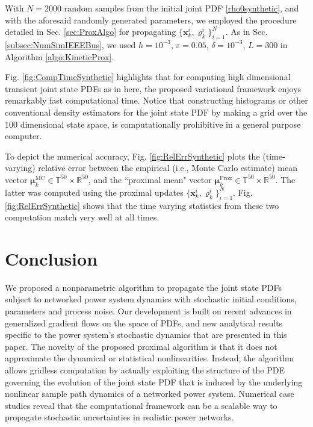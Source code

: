 \documentclass[10pt,twocolumn]{IEEEtran}
\begin{document}
With $N=2000$ random samples from the initial joint PDF \eqref{rho0synthetic}, and with the aforesaid randomly generated parameters, we employed the procedure detailed in Sec. \ref{sec:ProxAlgo} for propagating $\{\bm{x}_{k}^{i},\varrho_{k}^{i}\}_{i=1}^{N}$. As in Sec. \ref{subsec:NumSimIEEEBus}, we used $h=10^{-3}$, $\varepsilon = 0.05$, $\delta = 10^{-3}$, $L = 300$ in Algorithm \ref{algo:KineticProx}.

Fig. \ref{fig:CompTimeSynthetic} highlights that for computing high dimensional transient joint state PDFs as in here, the proposed variational framework enjoys remarkably fast computational time. Notice that constructing histograms or other conventional density estimators for the joint state PDF by making a grid over the 100 dimensional state space, is computationally prohibitive in a general purpose computer. 

To depict the numerical accuracy, Fig. \ref{fig:RelErrSynthetic} plots the (time-varying) relative error between the empirical (i.e., Monte Carlo estimate) mean vector $\bm{\mu}_{k}^{\text{MC}}\in\mathbb{T}^{50}\times\mathbb{R}^{50}$, and the ``proximal mean" vector $\bm{\mu}_{k}^{\text{Prox}}\in\mathbb{T}^{50}\times\mathbb{R}^{50}$. The latter was computed using the proximal updates $\{\bm{x}_{k}^{i},\varrho_{k}^{i}\}_{i=1}^{N}$. Fig. \ref{fig:RelErrSynthetic} shows that the time varying statistics from these two computation match very well at all times.





\section{Conclusion}\label{sec:conclusion}
We proposed a nonparametric algorithm to propagate the joint state PDFs subject to networked power system dynamics with stochastic initial conditions, parameters and process noise. Our development is built on recent advances in generalized gradient flows on the space of PDFs, and new analytical results specific to the power system's stochastic dynamics that are presented in this paper. The novelty of the proposed proximal algorithm is that it does not approximate the dynamical or statistical nonlinearities. Instead, the algorithm allows gridless computation by actually exploiting the structure of the PDE governing the evolution of the joint state PDF that is induced by the underlying nonlinear sample path dynamics of a networked power system. Numerical case studies reveal that the computational framework can be a scalable way to propagate stochastic uncertainties in realistic power networks.
\end{document}
